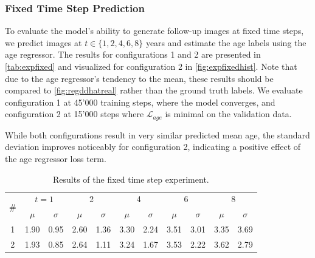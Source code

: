 \subsubsection*{Fixed Time Step Prediction}
To evaluate the model's ability to generate follow-up images at fixed time steps, we predict images at $t \in \{1, 2, 4, 6, 8\}$ years and estimate the age labels using the age regressor. The results for configurations 1 and 2 are presented in \autoref{tab:expfixed} and visualized for configuration 2 in \autoref{fig:expfixedhist}. Note that due to the age regressor's tendency to the mean, these results should be compared to \autoref{fig:regddhatreal} rather than the ground truth labels. We evaluate configuration 1 at 45'000 training steps, where the model converges, and configuration 2 at 15'000 steps where $\mathcal{L}_{age}$ is minimal on the validation data. 

While both configurations result in very similar predicted mean age, the standard deviation improves noticeably for configuration 2, indicating a positive effect of the age regressor loss term.

\begin{table}[h]
	\begin{center}
		\begin{tabular}{c c c c c c c c c c c}
			\toprule
			\multirow{2}{*}{\#} &
			\multicolumn{2}{c}{$t = 1$} &
			\multicolumn{2}{c}{2} &
			\multicolumn{2}{c}{4} &
			\multicolumn{2}{c}{6} &
			\multicolumn{2}{c}{8} \\
			\cmidrule(lr){2-3}
			\cmidrule(lr){4-5}
			\cmidrule(lr){6-7}
			\cmidrule(lr){8-9}
			\cmidrule(lr){10-11}
			 & $\mu$ & $\sigma$ & $\mu$ & $\sigma$ & $\mu$ & $\sigma$ & $\mu$ & $\sigma$ & $\mu$ & $\sigma$ \\
			\cmidrule(lr){1-11}
			1 & 1.90 & 0.95 & 2.60 & 1.36 & 3.30 & 2.24 & 3.51 & 3.01 & 3.35 & 3.69 \\
			2 & 1.93 & 0.85 & 2.64 & 1.11 & 3.24 & 1.67 & 3.53 & 2.22 & 3.62 & 2.79 \\
			\bottomrule
		\end{tabular}
		\caption{Results of the fixed time step experiment.}
		\label{tab:expfixed}
	\end{center}
\end{table}

